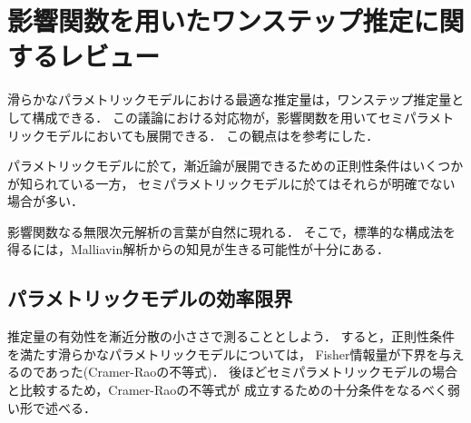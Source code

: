 \documentclass[uplatex, dvipdfmx]{jsarticle}
\begin{document}
\section{影響関数を用いたワンステップ推定に関するレビュー}

\begin{tcolorbox}[colframe=ForestGreen, colback=ForestGreen!10!white,breakable,colbacktitle=ForestGreen!40!white,coltitle=black,fonttitle=\bfseries\sffamily,
title=]
    滑らかなパラメトリックモデルにおける最適な推定量は，ワンステップ推定量として構成できる．
    この議論における対応物が，影響関数を用いてセミパラメトリックモデルにおいても展開できる．
    この観点は\cite{Kennedy}を参考にした．

    パラメトリックモデルに於て，漸近論が展開できるための正則性条件はいくつかが知られている一方，
    セミパラメトリックモデルに於てはそれらが明確でない場合が多い．

    影響関数なる無限次元解析の言葉が自然に現れる．
    そこで，標準的な構成法を得るには，Malliavin解析からの知見が生きる可能性が十分にある．
\end{tcolorbox}

\subsection{パラメトリックモデルの効率限界}

\begin{tcolorbox}[colframe=ForestGreen, colback=ForestGreen!10!white,breakable,colbacktitle=ForestGreen!40!white,coltitle=black,fonttitle=\bfseries\sffamily,
title=]
    推定量の有効性を漸近分散の小ささで測ることとしよう．
    すると，正則性条件を満たす滑らかなパラメトリックモデルについては，
    Fisher情報量が下界を与えるのであった(Cramer-Raoの不等式)．
    後ほどセミパラメトリックモデルの場合と比較するため，Cramer-Raoの不等式が
    成立するための十分条件をなるべく弱い形で述べる．
\end{tcolorbox}
\end{document}
